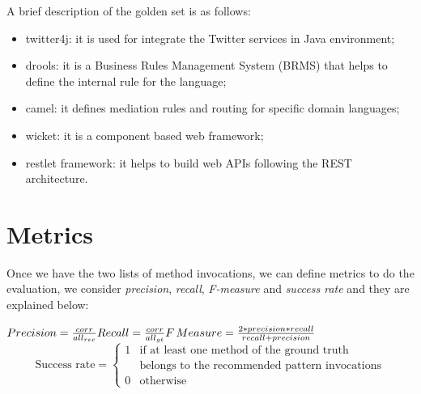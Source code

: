 A brief description of the golden set is as follows:

\begin{itemize}
\item twitter4j: it is used for integrate the Twitter services in Java environment;
\item drools: it is a Business Rules Management System (BRMS) that helps to define the internal rule for the language;
\item camel: it defines mediation rules and routing for specific domain languages;
\item wicket: it is a component based web framework;
\item restlet framework: it helps to build web APIs following the REST architecture. 
\end{itemize}




\section{Metrics}

Once we have the two lists of method invocations, we can define metrics to do the evaluation, we consider \emph{precision}, \emph{recall}, \emph{F-measure} and \emph{success rate} and they are explained below:


\begingroup

\noindent
$ Precision =  \frac{corr}{all_{rec}}\\  
\\
Recall  = \frac{corr}{all_{gt}} \\  
\\
F\,Measure =\frac{2*precision*recall}{recall+precision}\\
$
\begin{equation}
 \text{Success rate} =
    \begin{cases}
      1 & \text{if at least one method of the ground truth }\\
      & \text{belongs to the recommended pattern invocations}\\      
      0 & \text{otherwise}
    \end{cases}       
\end{equation}

\endgroup



